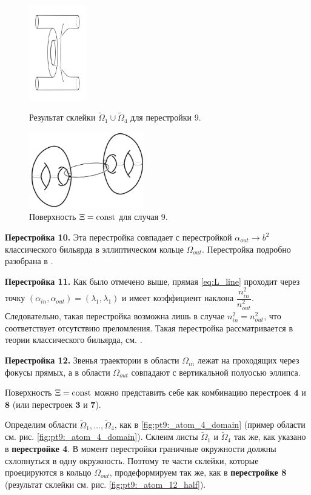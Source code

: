 \begin{figure}[!htb]
\centering
\includegraphics[width=2.5cm]{images/section2/atoms/atom_9_step.pdf}
\caption{Результат склейки $\widetilde{\Omega}_1 \cup \widetilde{\Omega}_4$ для перестройки 9.}
\label{fig:pt9:_atom_9_step}
\endminipage\hfill
{}
\centering
\includegraphics[width=5cm]{images/section2/atoms/atom_9.pdf}
\caption{Поверхность $\Xi = \mathrm{const}$ для случая 9.}
\label{fig:pt9:_atom_9}
\endminipage\hfill
\end{figure}

\textbf{Перестройка 10.}
Эта перестройка совпадает с перестройкой $\alpha_{out} \to b^2$ классического бильярда в эллиптическом кольце $\Omega_{out}$. Перестройка подробно разобрана в \cite[\S 3]{Fok15}.

\textbf{Перестройка 11.}
Как было отмечено выше, прямая \eqref{eq:L_line} проходит через точку $(\alpha_{in}, \alpha_{out}) = (\lambda_1, \lambda_1)$ и имеет коэффициент наклона $\dfrac{n_{in}^2}{n_{out}^2}$. 
Следовательно, такая перестройка возможна лишь в случае $n_{in}^2 = n_{out}^2$, что соответствует отсутствию преломления. Такая перестройка рассматривается в теории классического бильярда, см. \cite[\S 3]{Fok15}.

\textbf{Перестройка 12.}
Звенья траектории в области $\Omega_{in}$ лежат на проходящих через фокусы прямых, а в области $\Omega_{out}$ совпадают с вертикальной полуосью эллипса. 

Поверхность $\Xi = \mathrm{const}$ можно представить себе как комбинацию перестроек $\textbf{4}$ и $\textbf{8}$ (или перестроек $\textbf{3}$ и $\textbf{7}$). 

Определим области $\widetilde{\Omega}_1, \ldots, \widetilde{\Omega}_4$, как в \eqref{fig:pt9:_atom_4_domain} (пример области см. рис. \ref{fig:pt9:_atom_4_domain}).
Склеим листы $\widetilde{\Omega}_1$ и  $\widetilde{\Omega}_4$ так же, как указано в \textbf{перестройке 4}. В момент перестройки граничные окружности должны схлопнуться в одну окружность. Поэтому те части склейки, которые проецируются в кольцо $\Omega_{out}$, продеформируем так же, как в \textbf{перестройке 8} (результат склейки см. рис. \ref{fig:pt9:_atom_12_half}).

